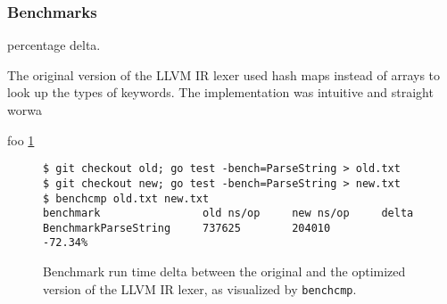 
\subsubsection{Benchmarks}
\label{sec:ver_benchmarks}

percentage delta.

The original version of the LLVM IR lexer used hash maps instead of arrays to look up the types of keywords. The implementation was intuitive and straight worwa


foo \ref{fig:benchmark_delta}

\begin{figure}[htbp]
	\begin{center}
		\begin{verbatim}
$ git checkout old; go test -bench=ParseString > old.txt
$ git checkout new; go test -bench=ParseString > new.txt
$ benchcmp old.txt new.txt
benchmark                old ns/op     new ns/op     delta
BenchmarkParseString     737625        204010        -72.34%
		\end{verbatim}
		\caption{Benchmark run time delta between the original and the optimized version of the LLVM IR lexer, as visualized by \texttt{benchcmp}\protect\footnotemark.}
		\label{fig:benchmark_delta}
	\end{center}
\end{figure}
